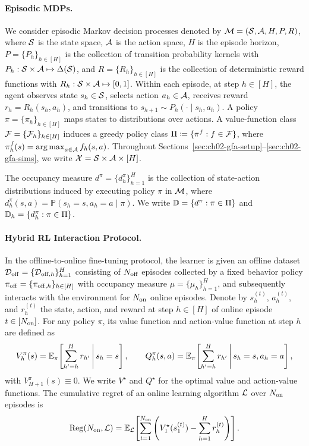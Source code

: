 \paragraph{Episodic MDPs.}
We consider episodic Markov decision processes denoted by ${\mathcal{M}} = ({\mathcal{S}}, {\mathcal{A}}, H, P, R)$, where ${\mathcal{S}}$ is the state space, ${\mathcal{A}}$ is the action space, $H$ is the episode horizon, $P = \{P_h\}_{h \in [H]}$ is the collection of transition probability kernels with $P_h: {\mathcal{S}} \times {\mathcal{A}} \mapsto \Delta({\mathcal{S}})$, and $R = \{R_h\}_{h \in [H]}$ is the collection of deterministic reward functions with $R_h: {\mathcal{S}} \times {\mathcal{A}} \mapsto [0, 1]$. Within each episode, at step $h \in [H]$, the agent observes state $s_h \in {\mathcal{S}}$, selects action $a_h \in {\mathcal{A}}$, receives reward $r_h = R_h(s_h, a_h)$, and transitions to $s_{h+1} \sim P_h(\cdot \mid s_h, a_h)$. A policy $\pi = \{\pi_h\}_{h \in [H]}$ maps states to distributions over actions. A value-function class ${\mathcal{F}} = \{{\mathcal{F}}_h\}_{h \in [H]}$ induces a greedy policy class $\Pi \coloneqq \{\pi^f : f\in {\mathcal{F}}\}$, where $\pi^f_h(s) = \operatorname*{arg\,max}_{a \in {\mathcal{A}}} f_h(s, a)$. Throughout Sections~\ref{sec:ch02-gfa-setup}--\ref{sec:ch02-gfa-sims}, we write ${\mathcal{X}} = {\mathcal{S}} \times {\mathcal{A}} \times [H]$.

\begin{defn}
\label{defn:ch02-occ}
The occupancy measure $d^{\pi} = \{d^{\pi}_h\}_{h = 1}^H$ is the collection of state-action distributions induced by executing policy $\pi$ in ${\mathcal{M}}$, where $d^\pi_h(s,a) = \mathbb{P}(s_h = s, a_h = a \mid \pi)$. We write ${\mathbb{D}} = \{d^\pi : \pi \in \Pi\}$ and ${\mathbb{D}}_h = \{d^\pi_h : \pi \in \Pi\}$.
\end{defn}

\paragraph{Hybrid RL Interaction Protocol.}
In the offline-to-online fine-tuning protocol, the learner is given an offline dataset ${\mathcal{D}}_{{\operatorname{off}}} = \{{\mathcal{D}}_{{\operatorname{off}}, h}\}_{h=1}^H$ consisting of $N_{{\operatorname{off}}}$ episodes collected by a fixed behavior policy $\pi_{{\operatorname{off}}} = \{\pi_{{\operatorname{off}}, h}\}_{h \in [H]}$ with occupancy measure $\mu = \{\mu_h\}_{h=1}^H$, and subsequently interacts with the environment for $N_{{\operatorname{on}}}$ online episodes. Denote by $s_{h}^{(t)}$, $a_{h}^{(t)}$, and $r_{h}^{(t)}$ the state, action, and reward at step $h \in [H]$ of online episode $t \in [N_{{\operatorname{on}}}]$. For any policy $\pi$, its value function and action-value function at step $h$ are defined as
\begin{equation}
    V_{h}^{\pi}(s) = \mathbb{E}_{\pi}\!\left[\sum_{h' = h}^H r_{h'} \,\middle|\, s_{h} = s\right], \qquad
    Q^{\pi}_h(s, a) = \mathbb{E}_{\pi}\!\left[\sum_{h' = h}^H r_{h'} \,\middle|\, s_{h} = s, a_{h} = a\right],
\end{equation}
with $V_{H+1}^{\pi}(s) \equiv 0$. We write $V^{\star}$ and $Q^{\star}$ for the optimal value and action-value functions. The cumulative regret of an online learning algorithm ${\mathcal{L}}$ over $N_{{\operatorname{on}}}$ episodes is
\begin{equation}
    \operatorname{Reg}(N_{{\operatorname{on}}}, {\mathcal{L}}) = \mathbb{E}_{{\mathcal{L}}}\!\left[\sum_{t = 1}^{N_{{\operatorname{on}}}}\left( V^\star_{1}(s_{1}^{(t)}) - \sum_{h = 1}^H r_{h}^{(t)} \right)\right].
\end{equation}

